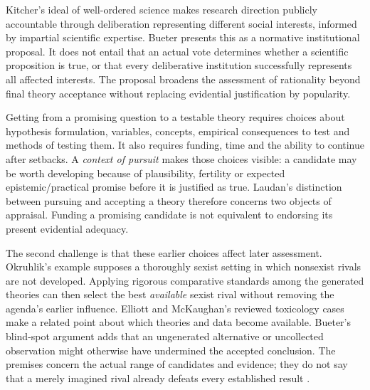 Kitcher's ideal of well-ordered science makes research direction publicly
accountable through deliberation representing different social interests,
informed by impartial scientific expertise. Bueter presents this as a
normative institutional proposal. It does not entail that an actual vote
determines whether a scientific proposition is true, or that every
deliberative institution successfully represents all affected interests.
The proposal broadens the assessment of rationality beyond final theory
acceptance without replacing evidential justification by popularity.

Getting from a promising question to a testable theory requires choices
about hypothesis formulation, variables, concepts, empirical consequences
to test and methods of testing them. It also requires funding, time and
the ability to continue after setbacks. A \emph{context of pursuit} makes
those choices visible: a candidate may be worth developing because of
plausibility, fertility or expected epistemic/practical promise before
it is justified as true. Laudan's distinction between pursuing and accepting
a theory therefore concerns two objects of appraisal. Funding a promising
candidate is not equivalent to endorsing its present evidential adequacy.

The second challenge is that these earlier choices affect later assessment.
Okruhlik's example supposes a thoroughly sexist setting in which nonsexist
rivals are not developed. Applying rigorous comparative standards among
the generated theories can then select the best \emph{available} sexist
rival without removing the agenda's earlier influence. Elliott and
McKaughan's reviewed toxicology cases make a related point about which
theories and data become available. Bueter's blind-spot argument adds that
an ungenerated alternative or uncollected observation might otherwise have
undermined the accepted conclusion. The premises concern the actual range
of candidates and evidence; they do not say that a merely imagined rival
already defeats every established result
\cite[pp.~759--760]{Bueter2021ValueFreedom}.

